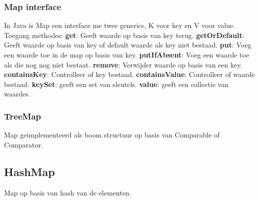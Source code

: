 \subsubsection{Map interface}
In Java is Map een interface me twee generics, K voor key en V voor value.
Toegang methodes:
\textbf{get}: Geeft waarde op basis van key terug.
\textbf{getOrDefault}: Geeft waarde op basis van key of default waarde als key niet bestaad.
\textbf{put}: Voeg een waarde toe in de map op basis van key.
\textbf{putIfAbsent}: Voeg een waarde toe als die nog nog niet bestaat.
\textbf{remove}: Verwijder waarde op basis van een key.
\textbf{containsKey}: Controlleer of key bestaad.
\textbf{containsValue}: Controlleer of waarde bestaad.
\textbf{keySet}: geeft een set van sleutels.
\textbf{value}: geeft een collectie van waardes.

\subsubsection{TreeMap}
Map geimplementeerd als boom structuur op basis van Comparable of Comparator. 

\subsection{HashMap}
Map op basis van hash van de elementen. 
